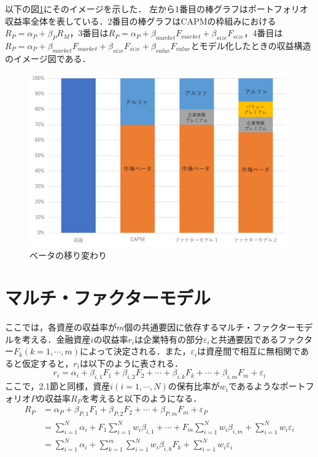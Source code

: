 \documentclass[11pt]{jreport}
\begin{document}
以下の図\ref{fig:beta}にそのイメージを示した．
左から1番目の棒グラフはポートフォリオ収益率全体を表している．2番目の棒グラフはCAPMの枠組みにおける$R_P=\alpha_P + \beta_PR_M$，3番目は$R_P = \alpha_P + \beta_{market}F_{market} + \beta_{size}F_{size}$，4番目は$R_P = \alpha_P + \beta_{market}F_{market} + \beta_{size}F_{size} + \beta_{value}F_{value}$とモデル化したときの収益構造のイメージ図である．

\begin{figure}[H]
	\begin{center}
		\includegraphics[width=14cm]{./fig/beta}
		\caption{ベータの移り変わり}
		\label{fig:beta}
	\end{center}
\end{figure}




\section{マルチ・ファクターモデル}
ここでは，各資産の収益率が$m$個の共通要因に依存するマルチ・ファクターモデルを考える．金融資産$i$の収益率$r_i$は企業特有の部分$\varepsilon_i$と共通要因であるファクター$F_k(k=1,\cdots,m)$によって決定される．また，$\varepsilon_i$は資産間で相互に無相関であると仮定すると，$r_i$は以下のように表される．
\begin{equation}
r_i = \alpha_i + \beta_{i,1}F_1 + \beta_{i,2}F_2 + \cdots + \beta_{i,k}F_k + \cdots + \beta_{i,m}F_m + \varepsilon_i
\label{eq:multifactor}
\end{equation}
ここで，2.1節と同様，資産$i(i=1,\cdots,N)$の保有比率が$w_i$であるようなポートフォリオ$P$の収益率$R_P$を考えると以下のようになる．
\begin{equation}
\begin{split}
R_P &= \alpha_P + \beta_{P,1} F_1 + \beta_{P,2} F_2 + \cdots + \beta_{P,m} F_m + \varepsilon_P\\
&=\sum_{i=1}^N \alpha_i + F_1 \sum_{i=1}^N w_i \beta_{i,1} + \cdots + F_m \sum_{i=1}^N w_i \beta_{i,m} + \sum_{i=1}^N w_i\varepsilon_i\\
&= \sum_{i=1}^N \alpha_i + \sum_{k=1}^m \sum_{i=1}^N w_i \beta_{i,k} F_k + \sum_{i=1}^N w_i\varepsilon_i
\label{eq:multi}
\end{split}
\end{equation}
\end{document}

